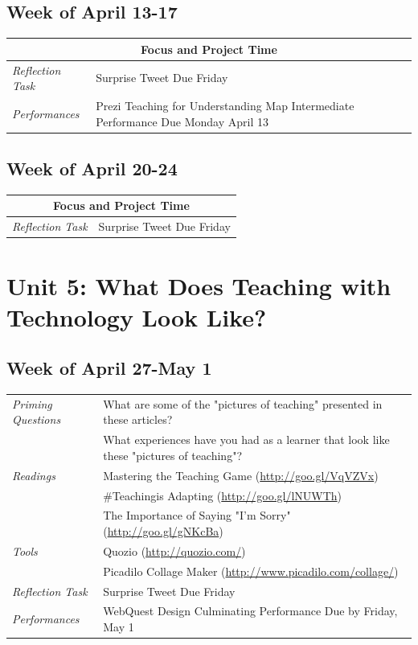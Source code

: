 \documentclass{tufte-handout}
\newcommand{\tabpq}{\faQuestionSign\medspace\textit{Priming Questions}}
\newcommand{\tabread}{\faBook\medspace\textit{Readings}}
\newcommand{\tabtools}{\faWrench\medspace\textit{Tools}}
\newcommand{\tabtweet}{\faLightbulb\medspace\textit{Reflection Task} & Surprise Tweet Due Friday \\}
\newcommand{\tabperformance}{\faTasks\medspace\textit{Performances}}
\newenvironment{tabsched}
	{\small
	\begin{tabular}{p{1.5in}p{5in}}
	\toprule}
	{\bottomrule
	\end{tabular}
	\normalsize}
\begin{document}
\begin{fullwidth}
\subsection{Week of April 13-17}

\begin{tabsched}
	\multicolumn{2}{c}{\textbf{Focus and Project Time}} \\
	\midrule
	\tabtweet
	\midrule
	\tabperformance & Prezi Teaching for Understanding Map Intermediate Performance Due Monday April 13 \\
\end{tabsched}

\subsection{Week of April 20-24}

\begin{tabsched}
	\multicolumn{2}{c}{\textbf{Focus and Project Time}} \\
	\midrule
	\tabtweet
\end{tabsched}

\section{Unit 5: What Does Teaching with Technology Look Like?}

\subsection{Week of April 27-May 1}

\begin{tabsched}
	\tabpq & What are some of the "pictures of teaching" presented in these articles? \\
	& What experiences have you had as a learner that look like these "pictures of teaching"? \\
	\midrule
	\tabread & Mastering the Teaching Game (\url{http://goo.gl/VqVZVx}) \\
	& \#Teachingis Adapting (\url{http://goo.gl/lNUWTh}) \\
	& The Importance of Saying "I'm Sorry" (\url{http://goo.gl/gNKcBa}) \\
	\midrule
	\tabtools & Quozio (\url{http://quozio.com/}) \\
	& Picadilo Collage Maker (\url{http://www.picadilo.com/collage/}) \\
	\midrule
	\tabtweet
	\midrule
	\tabperformance & WebQuest Design Culminating Performance Due by Friday, May 1 \\
\end{tabsched}


\end{fullwidth}
\end{document}
